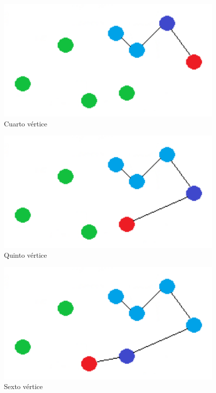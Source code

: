 \vspace{0.5cm}
\begin{figure}[htb] 
	\centering
	\includegraphics[width=1.75\textwidth]{./Imagenes/vecino3.png}
	\caption{Cuarto vértice} 
\end{figure}

\vspace{0.5cm}
\begin{figure}[htb] 
	\centering
	\includegraphics[width=1.75\textwidth]{./Imagenes/vecino4.png}
	\caption{Quinto vértice} 
\end{figure}

\vspace{0.5cm}
\begin{figure}[htb] 
	\centering
	\includegraphics[width=1.75\textwidth]{./Imagenes/vecino5.png}
	\caption{Sexto vértice} 
\end{figure}

